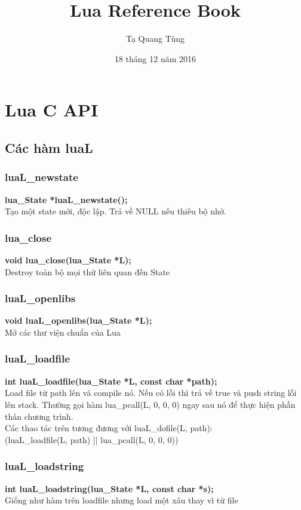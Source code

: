 \documentclass[12pt]{article}
\begin{document}
\title{\Huge\color[rgb]{0,1,0} Lua Reference Book}
\date{18 tháng 12 năm 2016}
\author{\Large\color[rgb]{0,0,1} Tạ Quang Tùng}
\maketitle

\tableofcontents
\newpage

\section{Lua C API} 

\subsection{Các hàm luaL}
\subsubsection{luaL\_newstate}
\textbf{lua\_State *luaL\_newstate();} \\
Tạo một state mới, độc lập. Trả về NULL nếu thiếu bộ nhớ. 
\subsubsection{lua\_close} 
\textbf{void lua\_close(lua\_State *L);} \\
Destroy toàn bộ mọi thứ liên quan đến State
\subsubsection{luaL\_openlibs} 
\textbf{void luaL\_openlibs(lua\_State *L);} \\
Mở các thư viện chuẩn của Lua
\subsubsection{luaL\_loadfile}
\textbf{int luaL\_loadfile(lua\_State *L, const char *path);} \\
Load file từ path lên và compile nó. Nếu có lỗi thì trả về true và push string lỗi lên stack. Thường gọi hàm lua\_pcall(L, 0, 0, 0) ngay sau nó để thực hiện phần thân chương trình. \\
Các thao tác trên tương đương với luaL\_dofile(L, path): \\
(luaL\_loadfile(L, path) || lua\_pcall(L, 0, 0, 0))
\subsubsection{luaL\_loadstring} 
\textbf{int luaL\_loadstring(lua\_State *L, const char *s);} \\
Giống như hàm trên loadfile nhưng load một xâu thay vì từ file
\end{document}
